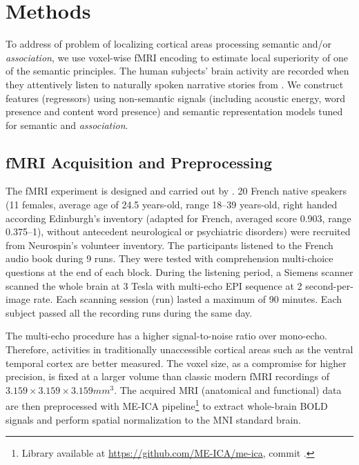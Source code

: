 \chapter{Methods} %

\label{chap:methods} %


To address of problem of localizing cortical areas processing semantic \similarity and\slash or \emph{association}, we use voxel-wise fMRI encoding to estimate local superiority of one of the semantic principles. The human subjects' brain activity are recorded when they attentively listen to naturally spoken narrative stories from . We construct features (regressors) using non-semantic signals (including acoustic energy, word presence and content word presence) and semantic representation models tuned for semantic \similarity and \emph{association}. 

\section{fMRI Acquisition and Preprocessing}
\label{sec:fmriAcquAndPrepro}

The fMRI experiment is designed and carried out by \textcite{todorovicAnalysesIRMfLors2018}. 20 French native speakers (11 females, average age of 24.5 years-old, range 18--39 years-old, right handed according Edinburgh's inventory \parencite{oldfieldAssessmentAnalysisHandedness1971a} (adapted for French, averaged score 0.903, range 0.375--1), without antecedent neurological or psychiatric disorders) were recruited from Neurospin's volunteer inventory. The participants listened to the French audio book  \parencite{desaint-exuperyLittlePrinceFrench2011} during 9 runs. They were tested with comprehension multi-choice questions at the end of each block. During the listening period, a Siemens scanner scanned the whole brain at 3 Tesla with multi-echo EPI sequence at 2 second-per-image rate. Each scanning session (run) lasted a maximum of 90 minutes. Each subject passed all the recording runs during the same day. 

The multi-echo procedure has a higher signal-to-noise ratio over mono-echo. Therefore, activities in traditionally unaccessible cortical areas such as the ventral temporal cortex are better measured. The voxel size, as a compromise for higher precision, is fixed at a larger volume than classic modern fMRI recordings of  \(3.159 \times 3.159 \times 3.159 mm ^ 3\). The acquired MRI (anatomical and functional) data are then preprocessed with ME-ICA pipeline\footnote{Library available at \url{https://github.com/ME-ICA/me-ica}, commit .} \parencite{kunduDifferentiatingBOLDNonBOLD2012} to extract whole-brain BOLD signals and perform spatial normalization to the MNI standard brain. 


